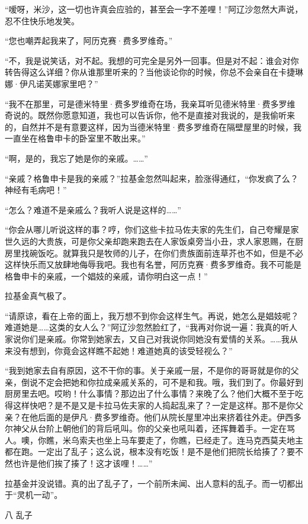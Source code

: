 \par “嗳呀，米沙，这一切也许真会应验的，甚至会一字不差哩！”阿辽沙忽然大声说，忍不住快乐地发笑。
\par “您也嘲弄起我来了，阿历克赛·费多罗维奇。”
\par “不，我是说笑话，对不起。我想的可完全是另外一回事。但是对不起：谁会对你转告得这么详细？你从谁那里听来的？当他谈论你的时候，你总不会亲自在卡捷琳娜·伊凡诺芙娜家里吧？”
\par “我不在那里，可是德米特里·费多罗维奇在场，我亲耳听见德米特里·费多罗维奇说的。既然你愿意知道，我也可以告诉你，他不是直接对我说的，是我偷听来的，自然并不是有意要这样，因为当德米特里·费多罗维奇在隔壁屋里的时候，我一直坐在格鲁申卡的卧室里不敢出来。”
\par “啊，是的，我忘了她是你的亲戚。……”
\par “亲戚？格鲁申卡是我的亲戚？”拉基金忽然叫起来，脸涨得通红，“你发疯了么？神经有毛病吧！”
\par “怎么？难道不是亲戚么？我听人说是这样的……”
\par “你会从哪儿听说这样的事？哼，你们这些卡拉马佐夫家的先生们，自己夸耀是家世久远的大贵族，可是你父亲却跑来跑去在人家饭桌旁当小丑，求人家恩赐，在厨房里找碗饭吃。就算我只是牧师的儿子，在你们贵族面前连草芥也不如，但是不必这样快乐而又放肆地侮辱我吧。我也有名誉，阿历克赛·费多罗维奇。我不可能是格鲁申卡的亲戚，一个娼妓的亲戚，请你明白这一点！”
\par 拉基金真气极了。
\par “请原谅，看在上帝的面上，我万想不到你会这样生气。再说，她怎么是娼妓呢？难道她是……这类的女人么？”阿辽沙忽然脸红了，“我再对你说一遍：我真的听人家说你们是亲戚。你常到她家去，又自己对我说你同她没有爱情的关系。……我从来没有想到，你竟会这样瞧不起她！难道她真的该受轻视么？”
\par “我到她家去自有原因，这不干你的事。关于亲戚一层，不是你的哥哥就是你的父亲，倒说不定会把她和你拉成亲戚关系的，可不是和我。哦，我们到了。你最好到厨房里去吧。哎哟！什么事情？那边出了什么事情？来晚了么？他们大概不至于吃得这样快吧？是不是又是卡拉马佐夫家的人捣起乱来了？一定是这样。那不是你父亲？在他后面的是伊凡·费多罗维奇。他们从院长屋里冲出来挤着往外走。伊西多尔神父从台阶上朝他们的背后吼叫。你的父亲也吼叫着，还挥舞着手。一定在骂人。噢，你瞧，米乌索夫也坐上马车要走了，你瞧，已经走了。连马克西莫夫地主都在跑。一定出了乱子；这么说，根本没有吃饭！是不是他们把院长给揍了？要不然也许是他们挨了揍了！这才该哩！……”
\par 拉基金并没说错。真的出了乱子了，一个前所未闻、出人意料的乱子。而一切都出于“灵机一动”。
\par 八 乱子
